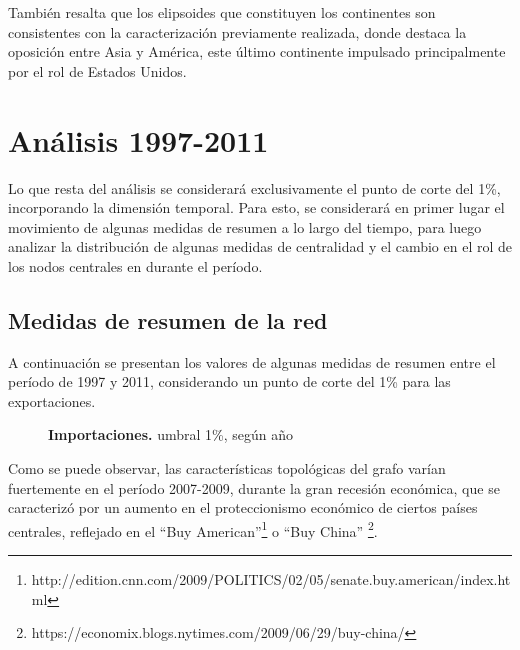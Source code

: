 \documentclass[runningheads,a4paper]{llncs}
\begin{document}
También resalta que los elipsoides que constituyen los continentes son consistentes con la caracterización previamente realizada, donde destaca la oposición entre Asia y América, este último continente impulsado principalmente por el rol de Estados Unidos.


\section{Análisis 1997-2011}

Lo que resta del análisis se considerará exclusivamente el punto de corte del 1\%, incorporando la dimensión temporal. Para esto, se considerará en primer lugar el movimiento de algunas medidas de resumen a lo largo del tiempo, para luego analizar la distribución de algunas medidas de centralidad y el cambio en el rol de los nodos centrales en durante el período.


\subsection{Medidas de resumen de la red}

A continuación se presentan los valores de algunas medidas de resumen entre el período de 1997 y 2011, considerando un punto de corte del 1\% para las exportaciones. 



\begin{figure}
\centering
{}
\caption{\textbf{Importaciones.} umbral 1\%, según año}
\label{fig:caracteristicas_yr}
\end{figure}


Como se puede observar, las características topológicas del grafo varían fuertemente en el período 2007-2009, durante la gran recesión económica, que se caracterizó por un aumento en el proteccionismo económico de ciertos países centrales, reflejado en el “Buy American”\footnote{http://edition.cnn.com/2009/POLITICS/02/05/senate.buy.american/index.html} o “Buy China” \footnote{https://economix.blogs.nytimes.com/2009/06/29/buy-china/}. 
\end{document}

